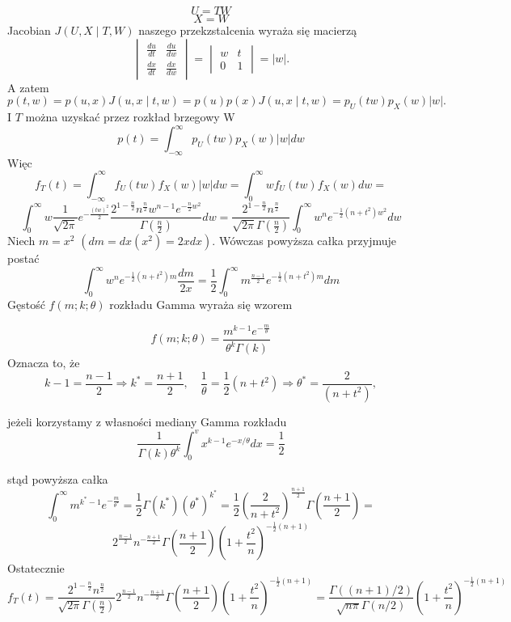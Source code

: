\documentclass[12pt]{article}
\begin{document}
$$U = TW$$
$$X = W$$
Jacobian $J(U,X\mid T,W)$ naszego przekzstalcenia wyraża się macierzą
$$\begin{vmatrix}{\frac {du}{dt}}&{\frac {du}{dw}}\\
{\frac {dx}{dt}}&{\frac {dx}{dw}}\end{vmatrix}=
{\begin{vmatrix}w&t\\0&1\end{vmatrix}}=|w|. $$
A zatem
$$ p(t,w)=p(u,x)J(u,x\mid t,w)=
p(u)p(x)J(u,x\mid t,w)=p_{U}(tw)p_{X}(w)|w|.  $$
I $T$ można uzyskać przez rozkład brzegowy W
$$p(t)=\int _{-\infty }^{\infty }p_{U}(tw)p_{X}(w)|w|dw $$
Więc 
$$ f_{T}(t)=\int _{-\infty }^{\infty }f_{U}(tw)f_{X}(w)|w|dw =
   \int _{0 }^{\infty }wf_{U}(tw)f_{X}(w)dw = $$
  $$ \int _{0 }^{\infty }w \frac{1}{\sqrt{2\pi}}e^{-\frac{(tw)^2}{2}} 
   \frac{2^{1-\frac{n}{2}}n^{\frac{n}{2}}w^{n-1}e^{-\frac{n}{2}w^{2}}}{\Gamma(\frac{n}{2})}dw  =  
   \frac{2^{1-\frac{n}{2}}n^{\frac{n}{2}}}{\sqrt{2\pi}\Gamma(\frac{n}{2})}
   \int _{0 }^{\infty } w^{n}e^{-\frac{1}{2}(n+t^{2})w^{2}}dw $$
Niech $m = x^{2}$ $(dm=dx(x^{2})=2xdx)$. Wówczas powyższa całka przyjmuje postać
$$ \int _{0 }^{\infty } w^{n}e^{-\frac{1}{2}(n+t^{2})m}\frac{dm}{2x}=
	\frac{1}{2}\int _{0 }^{\infty }m^{\frac{n-1}{2}}e^{-\frac{1}{2}(n+t^{2})m}dm $$
Gęstość $f(m;k;\theta)$ rozkładu Gamma wyraża się wzorem

$$ f(m;k;\theta)=\frac{m^{k-1}e^{-\frac{m}{\theta}}}{\theta^{k}\Gamma(k)} $$
Oznacza to, że
$$ k-1 = \frac{n-1}{2} \Rightarrow k^* = \frac{n+1}{2}, \quad 
\frac{1}{\theta} = \frac{1}{2}(n+t^2)\Rightarrow\theta^*=\frac{2}{(n+t^2)},$$

jeżeli korzystamy z własności mediany Gamma rozkładu
$$ \frac{1}{\Gamma(k)\theta^k}\int _{0}^{v} x^{k-1}e^{-x/\theta}dx = \frac{1}{2} $$

stąd powyższa całka 
$$ \int _{0 }^{\infty } m^{k^*-1}e^{-\frac{m}{\theta^*}} = 
	\frac{1}{2}\Gamma(k^*)(\theta^*)^{k^*} = 
	\frac{1}{2}(\frac{2}{n+t^2})^\frac{n+1}{2}\Gamma(\frac{n+1}{2}) =$$
$$ 2^{\frac{n-1}{2}}n^{-\frac{n+1}{2}}\Gamma(\frac{n+1}{2})(1+\frac{t^2}{n})^{-\frac{1}{2}(n+1)}$$
Ostatecznie
$$ f_{T}(t)= \frac{2^{1-\frac{n}{2}}n^{\frac{n}{2}}}{\sqrt{2\pi}\Gamma(\frac{n}{2})}
2^{\frac{n-1}{2}}n^{-\frac{n+1}{2}}\Gamma(\frac{n+1}{2})(1+\frac{t^2}{n})^{-\frac{1}{2}(n+1)}= 
\frac{\Gamma((n+1)/2)}{\sqrt{n\pi}\Gamma(n/2)}(1+\frac{t^2}{n})^{-\frac{1}{2}(n+1)} $$
\end{document}

